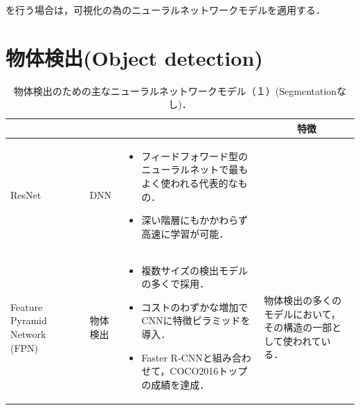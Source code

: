\documentclass[originalpaper,fleqn]{jsaiart}     %
\begin{document}
を行う場合は，可視化の為のニューラルネットワークモデル\cite{SCDVPB17,SCDVPB20}を適用する．

\section{物体検出(Object detection)}
\begin{table}
    \caption{物体検出のための主なニューラルネットワークモデル（１）(Segmentationなし)．}
    \label{tbl-cheat1}
    \begin{center}
        \setlength{\tabcolsep}{3pt}
        \footnotesize
        \begin{tabularx}{\linewidth}{Xp{1.5cm}Xp{7cm}X} \toprule
            \centering{モデル名称} & \centering{文献} & \centering{用途} & \centering{概要} & \multicolumn{1}{c}{特徴} \\ \midrule

            ResNet & \cite{HZRS16} & DNN & 
            \begin{itemize}
                \vspace{-0.7\baselineskip}
                \setlength{\leftskip}{-3mm}
                \item フィードフォワード型のニューラルネットで最もよく使われる代表的なもの．
                \item  深い階層にもかかわらず高速に学習が可能．
            \end{itemize} &   \\
            
            Feature Pyramid Network (FPN) & \cite{LDGHHB17} & 物体検出 & 
            \begin{itemize}
                \vspace{-0.7\baselineskip}
                \setlength{\leftskip}{-3mm}
                \item 複数サイズの検出モデルの多くで採用．
                \item コストのわずかな増加でCNNに特徴ピラミッドを導入．
                \item Faster R-CNNと組み合わせて，COCO2016トップの成績を達成． 
            \end{itemize}
            & 物体検出の多くのモデルにおいて，その構造の一部として使われている．\\


\end{tabularx}
\end{center}
\end{table}
\end{document}

